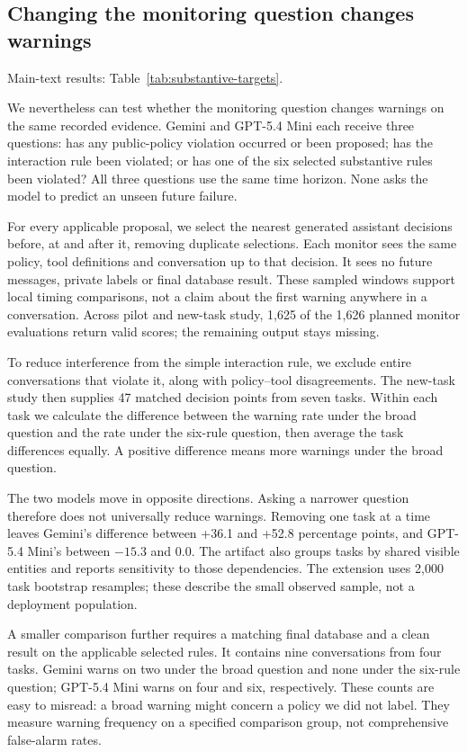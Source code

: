 \subsection{Changing the monitoring question changes warnings}
Main-text results: Table~\ref{tab:substantive-targets}.

We nevertheless can test whether the monitoring question changes warnings on the same recorded evidence. Gemini and GPT-5.4 Mini each receive three questions: has any public-policy violation occurred or been proposed; has the interaction rule been violated; or has one of the six selected substantive rules been violated? All three questions use the same time horizon. None asks the model to predict an unseen future failure.

For every applicable proposal, we select the nearest generated assistant decisions before, at and after it, removing duplicate selections. Each monitor sees the same policy, tool definitions and conversation up to that decision. It sees no future messages, private labels or final database result. These sampled windows support local timing comparisons, not a claim about the first warning anywhere in a conversation. Across pilot and new-task study, 1,625 of the 1,626 planned monitor evaluations return valid scores; the remaining output stays missing.

To reduce interference from the simple interaction rule, we exclude entire conversations that violate it, along with policy--tool disagreements. The new-task study then supplies 47 matched decision points from seven tasks. Within each task we calculate the difference between the warning rate under the broad question and the rate under the six-rule question, then average the task differences equally. A positive difference means more warnings under the broad question.



The two models move in opposite directions. Asking a narrower question therefore does not universally reduce warnings. Removing one task at a time leaves Gemini's difference between +36.1 and +52.8 percentage points, and GPT-5.4 Mini's between $-15.3$ and 0.0. The artifact also groups tasks by shared visible entities and reports sensitivity to those dependencies. The extension uses 2,000 task bootstrap resamples; these describe the small observed sample, not a deployment population.

A smaller comparison further requires a matching final database and a clean result on the applicable selected rules. It contains nine conversations from four tasks. Gemini warns on two under the broad question and none under the six-rule question; GPT-5.4 Mini warns on four and six, respectively. These counts are easy to misread: a broad warning might concern a policy we did not label. They measure warning frequency on a specified comparison group, not comprehensive false-alarm rates.

